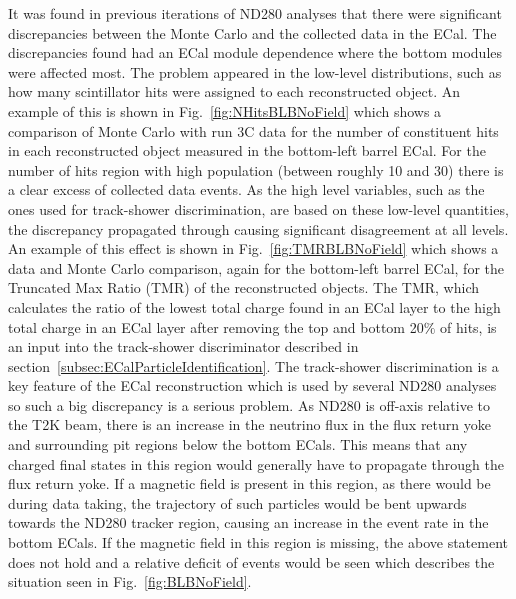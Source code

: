 It was found in previous iterations of ND280 analyses that there were significant discrepancies between the Monte Carlo and the collected data in the ECal.  The discrepancies found had an ECal module dependence where the bottom modules were affected most.  The problem appeared in the low-level distributions, such as how many scintillator hits were assigned to each reconstructed object.  An example of this is shown in Fig.~\ref{fig:NHitsBLBNoField} which shows a comparison of Monte Carlo with run 3C data for the number of constituent hits in each reconstructed object measured in the bottom-left barrel ECal.  For the number of hits region with high population (between roughly 10 and 30) there is a clear excess of collected data events.  As the high level variables, such as the ones used for track-shower discrimination, are based on these low-level quantities, the discrepancy propagated through causing significant disagreement at all levels.  An example of this effect is shown in Fig.~\ref{fig:TMRBLBNoField} which shows a data and Monte Carlo comparison, again for the bottom-left barrel ECal, for the Truncated Max Ratio (TMR) of the reconstructed objects.  The TMR, which calculates the ratio of the lowest total charge found in an ECal layer to the high total charge in an ECal layer after removing the top and bottom 20$\%$ of hits, is an input into the track-shower discriminator described in section~\ref{subsec:ECalParticleIdentification}.  The track-shower discrimination is a key feature of the ECal reconstruction which is used by several ND280 analyses so such a big discrepancy is a serious problem.
\newline
\newline
As ND280 is off-axis relative to the T2K beam, there is an increase in the neutrino flux in the flux return yoke and surrounding pit regions below the bottom ECals.  This means that any charged final states in this region would generally have to propagate through the flux return yoke.  If a magnetic field is present in this region, as there would be during data taking, the trajectory of such particles would be bent upwards towards the ND280 tracker region, causing an increase in the event rate in the bottom ECals.  If the magnetic field in this region is missing, the above statement does not hold and a relative deficit of events would be seen which describes the situation seen in Fig.~\ref{fig:BLBNoField}.
